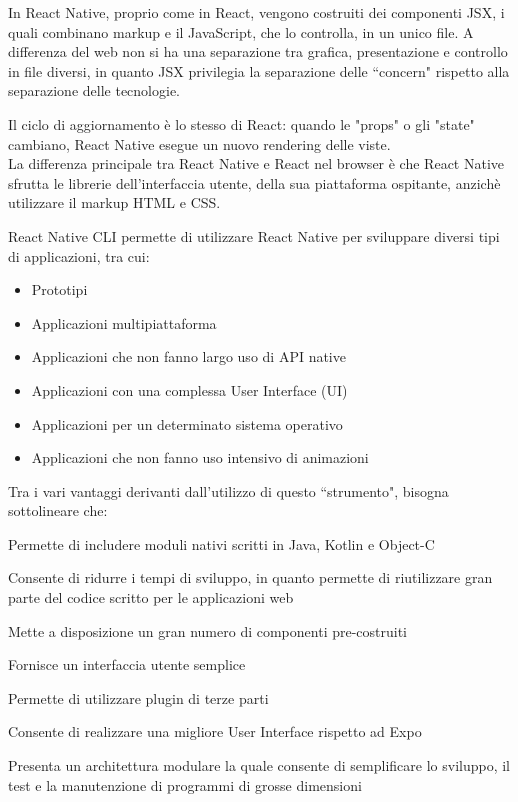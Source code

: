 In React Native, proprio come in React, vengono costruiti dei componenti JSX, i quali combinano markup e il JavaScript, che lo controlla, in un unico file. A differenza del web non
si ha una separazione tra grafica, presentazione e controllo in file diversi, in quanto JSX privilegia la separazione delle ``concern" rispetto alla
separazione delle tecnologie.

Il ciclo di aggiornamento \`e lo stesso di React: quando le "props"  o gli "state" cambiano, React Native esegue un nuovo rendering delle viste.\\
La differenza principale tra React Native e React nel browser \`e che React Native sfrutta le librerie dell'interfaccia utente, della sua piattaforma ospitante,
anzich\`e utilizzare il markup HTML e CSS.

React Native CLI permette di utilizzare React Native per sviluppare diversi tipi di applicazioni, tra cui:
\begin{itemize}
      \item Prototipi
      \item Applicazioni multipiattaforma
      \item Applicazioni che non fanno largo uso di API native
      \item Applicazioni con una complessa User Interface {}(UI)
      \item Applicazioni per un determinato sistema operativo
      \item Applicazioni che non fanno uso intensivo di animazioni
\end{itemize}
Tra i vari vantaggi derivanti dall'utilizzo di questo ``strumento", bisogna sottolineare che:
\begin{list}{*}{}
      \item Permette di includere moduli nativi scritti in Java, Kotlin e Object-C
      \item Consente di ridurre i tempi di sviluppo, in quanto permette di riutilizzare gran parte del codice scritto per le applicazioni web
      \item Mette a disposizione un gran numero di componenti pre-costruiti
      \item Fornisce un interfaccia utente semplice
      \item Permette di utilizzare plugin di terze parti
      \item Consente di realizzare una migliore User Interface rispetto ad Expo
      \item Presenta un architettura modulare la quale consente di semplificare lo sviluppo, il test e la manutenzione di programmi di grosse dimensioni
\end{list}
